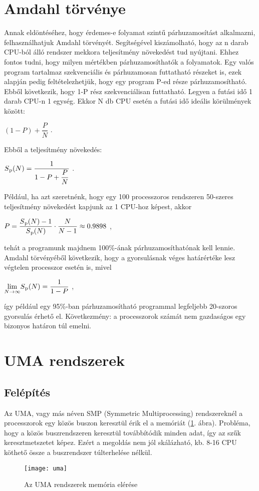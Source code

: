 \section{Amdahl törvénye}
Annak eldöntéséhez, hogy érdemes-e folyamat szintű párhuzamosítást alkalmazni, felhasználhatjuk Amdahl törvényét.
Segítségével kiszámolható, hogy az n darab CPU-ból álló rendszer mekkora teljesítmény növekedést tud nyújtani.
Ehhez fontos tudni, hogy milyen mértékben párhuzamosíthatók a folyamatok.
Egy valós program tartalmaz szekvenciális és párhuzamosan futtatható részeket is, ezek alapján pedig feltételezhetjük, hogy egy program P-ed része párhuzamosítható.
Ebből következik, hogy 1-P rész szekvenciálisan futtatható.
Legyen a futási idő 1 darab CPU-n 1 egység.
Ekkor N db CPU esetén a futási idő ideális körülmények között:
\begin{center}
    $(1-P)+\dfrac{P}{N}$ .
\end{center}
Ebből a teljesítmény növekedés:
\begin{center}
    $S\textsubscript{p}(N)=\dfrac{1}{1-P+\dfrac{P}{N}}$ .
\end{center}
Például, ha azt szeretnénk, hogy egy 100 processzoros rendszeren 50-szeres teljesítmény növekedést kapjunk az 1 CPU-hoz képest, akkor
\begin{center}
    $P=\dfrac{S\textsubscript{p}(N)-1}{S\textsubscript{p}(N)}\cdot\dfrac{N}{N-1}\approx0.9898$ ,
\end{center}
tehát a programunk majdnem 100\%-ának párhuzamosíthatónak kell lennie.
Amdahl törvényéből következik, hogy a gyorsulásnak véges határértéke lesz végtelen processzor esetén is, mivel
\begin{center}
    $\displaystyle{\lim_{N \to \infty}}S\textsubscript{p}(N)=\dfrac{1}{1-P}$ ,
\end{center}
így például egy 95\%-ban párhuzamosítható programmal legfeljebb 20-szoros gyorsulás érhető el.
Következmény: a processzorok számát nem gazdaságos egy bizonyos határon túl emelni.

\section{UMA rendszerek}
\subsection{Felépítés}
Az UMA, vagy más néven SMP (Symmetric Multiprocessing) rendszereknél a processzorok egy közös buszon keresztül érik el a memóriát (\ref{fig:uma}. ábra).
Probléma, hogy a közös buszrendszeren keresztül továbbítódik minden adat, így az szűk keresztmetszetet képez.
Ezért a megoldás nem jól skálázható, kb. 8-16 CPU köthető össze a buszrendszer túlterhelése nélkül.
\begin{figure}[H]
    \texttt{[image: uma]}
    \centering
    \caption{Az UMA rendszerek memória elérése}
    \label{fig:uma}
\end{figure}
